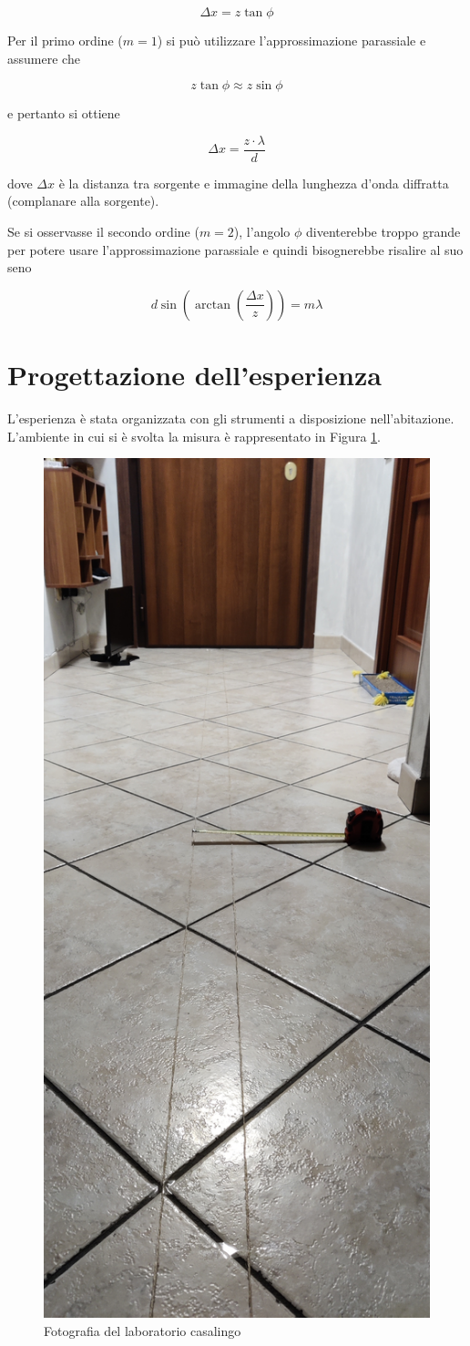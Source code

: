 \documentclass{article}
\begin{document}
\[\Delta x = z\tan\phi\]

Per il primo ordine ($m=1$) si può utilizzare l'approssimazione parassiale e assumere che 

\[z\tan\phi \approx z\sin\phi\]

e pertanto si ottiene 

\begin{equation}
    \Delta x = \frac{z \cdot \lambda}{d}
    \label{first_order_equation}
\end{equation}

dove $\Delta x$ è la distanza tra sorgente e immagine della lunghezza d'onda diffratta (complanare alla sorgente).

Se si osservasse il secondo ordine ($m=2$), l'angolo $\phi$ diventerebbe troppo grande per potere usare l'approssimazione parassiale e quindi bisognerebbe risalire al suo seno

\begin{equation}
    d\sin\left(\arctan\left(\frac{\Delta x}{z}\right)\right) = m\lambda
    \label{second_order_equation}
\end{equation}

\section{Progettazione dell'esperienza} \label{Progettazione}

L'esperienza è stata organizzata con gli strumenti a disposizione nell'abitazione. L'ambiente in cui si è svolta la misura è rappresentato in Figura \ref{ambiente}.

\begin{figure}[h!]
    \centering
    \includegraphics[width=0.2\linewidth]{Fili_Paralleli.jpg}
    \caption{Fotografia del laboratorio casalingo}
    \label{ambiente}
\end{figure}
\end{document}
